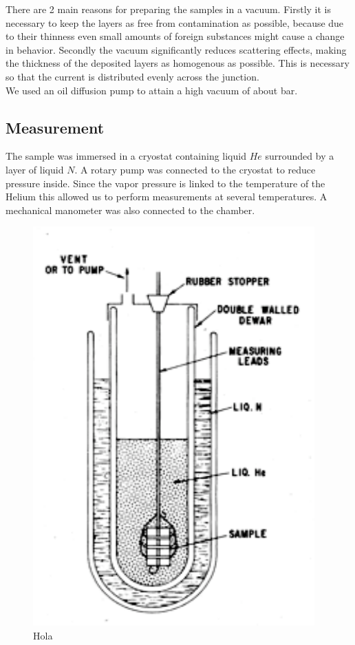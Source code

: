 There are 2 main reasons for preparing the samples in a vacuum. Firstly it is necessary to keep the layers as free from contamination as possible, because due to their thinness even small amounts of foreign substances might cause a change in behavior. Secondly the vacuum significantly reduces scattering effects, making the thickness of the deposited layers as homogenous as possible. This is necessary so that the current is distributed evenly across the junction.\\

We used an oil diffusion pump to attain a high vacuum of about bar.\\

\subsection{Measurement}
The sample was immersed in a cryostat containing liquid $He$ surrounded by a layer of liquid $N$. A rotary pump was connected to the cryostat to reduce pressure inside. Since the vapor pressure is linked to the temperature of the Helium this allowed us to perform measurements at several temperatures. A mechanical manometer was also connected to the chamber.\\

\begin{figure}
\centering
\includegraphics[scale=0.6]{cryostat.pdf}
\caption{Hola\label{cryostat}}
\end{figure}


